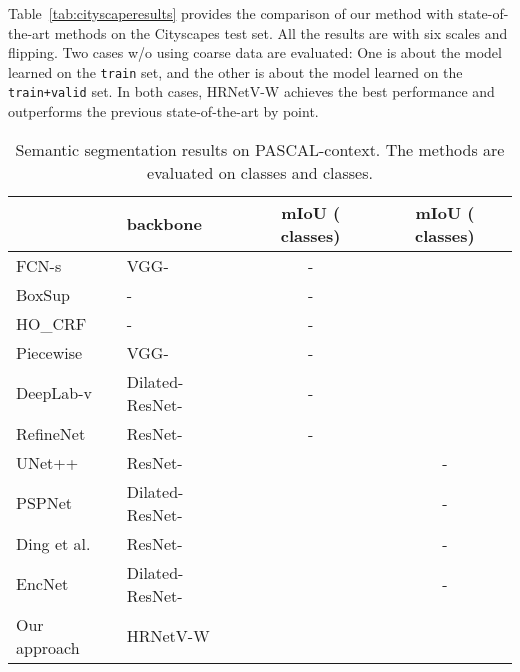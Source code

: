 \documentclass[10pt,twocolumn,letterpaper]{article}
\begin{document}
Table~\ref{tab:cityscaperesults} provides the comparison of our method
with state-of-the-art methods on the Cityscapes test set.
All the results are with six scales and flipping.
Two cases w/o using coarse data are evaluated:
One is about the model learned
on the \texttt{train} set,
and the other is about the model
learned on the \texttt{train+valid} set.
In both cases,
HRNetV-W achieves the best performance
and outperforms the previous state-of-the-art
by  point.
	
	\renewcommand{\arraystretch}{1.3}
	\setlength{\tabcolsep}{3.0pt}
	\begin{table}[t]
	\scriptsize
	\centering
	\caption{Semantic segmentation results on PASCAL-context. The methods are
	evaluated on  classes and  classes.}
	\label{tab:pasctxresults}
	\begin{tabular}{l|l|cc}
		\hline\noalign{\smallskip}
		  & backbone & mIoU ( classes) & mIoU ( classes) \\
		\hline
		
		\hline
		FCN-s~\cite{ShelhamerLD17} & VGG- & - &  \\
		BoxSup~\cite{DaiHS15} & - & - &  \\
		HO\_CRF~\cite{ArnabJ0T16} & - & - &  \\
		Piecewise~\cite{LinSHR16} & VGG- & - & \\
		DeepLab-v~\cite{ChenPKMY18} & Dilated-ResNet- & -&  \\
		RefineNet~\cite{LinMSR17} & ResNet- & - &  \\
		UNet++~\cite{ZhouSTL18} & ResNet- &  & - \\
		PSPNet~\cite{ZhaoSQWJ17} & Dilated-ResNet- &  & - \\
		Ding et al.~\cite{DingJSL018} & ResNet- &  & - \\
		EncNet~\cite{0005DSZWTA18} & Dilated-ResNet- &  & - \\
		\hline
		Our approach & HRNetV-W &   &  \\	
		\hline
	\end{tabular}
	\end{table}
\end{document}
